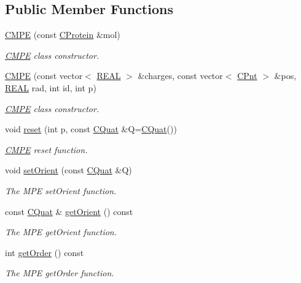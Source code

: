 \subsection*{Public Member Functions}
\begin{DoxyCompactItemize}
\item 
\hyperlink{classCMPE_aee8dd608bd75c7d0415da2746f54acee}{C\-M\-P\-E} (const \hyperlink{classCProtein}{C\-Protein} \&mol)
\begin{DoxyCompactList}\small\item\em \hyperlink{classCMPE}{C\-M\-P\-E} class constructor. \end{DoxyCompactList}\item 
\hyperlink{classCMPE_adbfa1276efd0ce18d73b6943542d6147}{C\-M\-P\-E} (const vector$<$ \hyperlink{util_8h_a5821460e95a0800cf9f24c38915cbbde}{R\-E\-A\-L} $>$ \&charges, const vector$<$ \hyperlink{classCPnt}{C\-Pnt} $>$ \&pos, \hyperlink{util_8h_a5821460e95a0800cf9f24c38915cbbde}{R\-E\-A\-L} rad, int id, int p)
\begin{DoxyCompactList}\small\item\em \hyperlink{classCMPE}{C\-M\-P\-E} class constructor. \end{DoxyCompactList}\item 
void \hyperlink{classCMPE_ae44b4e76215412230e279f34bd5b9fab}{reset} (int p, const \hyperlink{classCQuat}{C\-Quat} \&Q=\hyperlink{classCQuat}{C\-Quat}())
\begin{DoxyCompactList}\small\item\em \hyperlink{classCMPE}{C\-M\-P\-E} reset function. \end{DoxyCompactList}\item 
void \hyperlink{classCMPE_a688ea48a4a13e704fc97e27c0f6dc78a}{set\-Orient} (const \hyperlink{classCQuat}{C\-Quat} \&Q)
\begin{DoxyCompactList}\small\item\em The M\-P\-E set\-Orient function. \end{DoxyCompactList}\item 
const \hyperlink{classCQuat}{C\-Quat} \& \hyperlink{classCMPE_a30f8be93a38d1e9ead77be6bbdc8488f}{get\-Orient} () const 
\begin{DoxyCompactList}\small\item\em The M\-P\-E get\-Orient function. \end{DoxyCompactList}\item 
int \hyperlink{classCMPE_a047394488b2ce41894b336b6a1d8e30a}{get\-Order} () const 
\begin{DoxyCompactList}\small\item\em The M\-P\-E get\-Order function. \end{DoxyCompactList}\item 

\end{DoxyCompactItemize}
